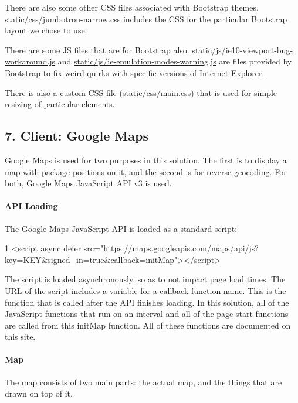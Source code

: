 There are also some other C\+SS files associated with Bootstrap themes. {\ttfamily static/css/jumbotron-\/narrow.\+css} includes the C\+SS for the particular Bootstrap layout we chose to use.

There are some JS files that are for Bootstrap also. {\ttfamily \hyperlink{ie10-viewport-bug-workaround_8js}{static/js/ie10-\/viewport-\/bug-\/workaround.\+js}} and {\ttfamily \hyperlink{ie-emulation-modes-warning_8js}{static/js/ie-\/emulation-\/modes-\/warning.\+js}} are files provided by Bootstrap to fix weird quirks with specific versions of Internet Explorer.

There is also a custom C\+SS file ({\ttfamily static/css/main.\+css}) that is used for simple resizing of particular elements.

\subsection*{7. Client\+: Google Maps}

Google Maps is used for two purposes in this solution. The first is to display a map with package positions on it, and the second is for reverse geocoding. For both, Google Maps Java\+Script A\+PI v3 is used.

\paragraph*{A\+PI Loading}

The Google Maps Java\+Script A\+PI is loaded as a standard script\+: 
\begin{DoxyCode}
1 <script async defer
       src="https://maps.googleapis.com/maps/api/js?key=KEY&signed\_in=true&callback=initMap"></script>
\end{DoxyCode}
 The script is loaded asynchronously, so as to not impact page load times. The U\+RL of the script includes a variable for a callback function name. This is the function that is called after the A\+PI finishes loading. In this solution, all of the Java\+Script functions that run on an interval and all of the page start functions are called from this init\+Map function. All of these functions are documented on this site.

\paragraph*{Map}

The map consists of two main parts\+: the actual map, and the things that are drawn on top of it.

